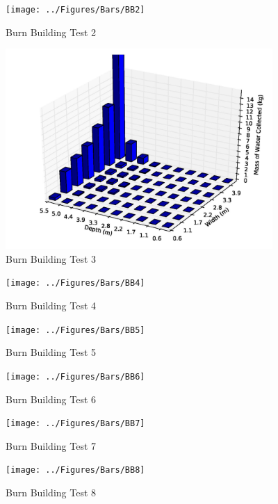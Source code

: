 \documentclass[12pt,oneside]{book}
\begin{document}
\begin{figure}[!ht]
	\texttt{[image: ../Figures/Bars/BB2]}
	\caption{Burn Building Test 2}
	\label{fig:Burn_Building_Test_2}
\end{figure}

\begin{figure}[!ht]
	\includegraphics[width=4in]{../Figures/Bars/BB3}
	\caption{Burn Building Test 3}
	\label{fig:Burn_Building_Test_3}
\end{figure}

\begin{figure}[!ht]
	\texttt{[image: ../Figures/Bars/BB4]}
	\caption{Burn Building Test 4}
	\label{fig:Burn_Building_Test_4}
\end{figure}

\clearpage

\begin{figure}[!ht]
	\texttt{[image: ../Figures/Bars/BB5]}
	\caption{Burn Building Test 5}
	\label{fig:Burn_Building_Test_5}
\end{figure}

\begin{figure}[!ht]
	\texttt{[image: ../Figures/Bars/BB6]}
	\caption{Burn Building Test 6}
	\label{fig:Burn_Building_Test_6}
\end{figure}

\begin{figure}[!ht]
	\texttt{[image: ../Figures/Bars/BB7]}
	\caption{Burn Building Test 7}
	\label{fig:Burn_Building_Test_7}
\end{figure}

\begin{figure}[!ht]
	\texttt{[image: ../Figures/Bars/BB8]}
	\caption{Burn Building Test 8}
	\label{fig:Burn_Building_Test_8}
\end{figure}
\end{document}
